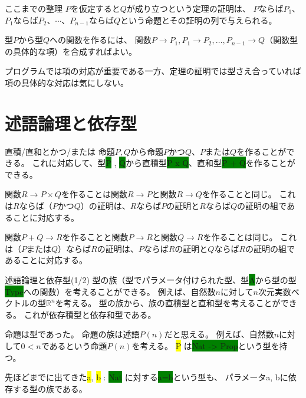 \documentclass[unicode,12pt]{beamer}%
\newcommand{\type}[1]{\colorbox{green}{#1}}
\newcommand{\term}[1]{\colorbox{yellow}{#1}}
\begin{document}
\begin{frame}{ここまでの整理}
  $P$を仮定すると$Q$が成り立つという定理の証明は、
  $P$ならば$P_1$、$P_1$ならば$P_2$、$\cdots$、$P_{n-1}$ならば$Q$という命題とその証明の列で与えられる。

  型$P$から型$Q$への関数を作るには、
  関数$P\to P_1, P_1\to P_2,\ldots, P_{n-1}\to Q$（関数型の具体的な項）を合成すればよい。

  \pause

  プログラムでは項の対応が重要である一方、定理の証明では型さえ合っていれば項の具体的な対応は気にしない。
\end{frame}

\section{述語論理と依存型}

\begin{frame}{直積/直和とかつ/または}
  命題$P, Q$から命題$P$かつ$Q$、$P$または$Q$を作ることができる。
  これに対応して、型\type{P} , \type{Q}から直積型\type{P x Q}、直和型\type{P + Q}を作ることができる。

  \pause

  関数$R\to P\times Q$を作ることは関数$R\to P$と関数$R\to Q$を作ることと同じ。
  これは$R$ならば（$P$かつ$Q$）の証明は、$R$ならば$P$の証明と$R$ならば$Q$の証明の組であることに対応する。

  \pause

  関数$P+Q\to R$を作ることと関数$P\to R$と関数$Q\to R$を作ることは同じ。
  これは（$P$または$Q$）ならば$R$の証明は、$P$ならば$R$の証明と$Q$ならば$R$の証明の組であることに対応する。
\end{frame}

\begin{frame}{述語論理と依存型(1/2)}
  型の族（型でパラメータ付けられた型、型\type{A}から型の型\type{Type}への関数）を考えることができる。
  例えば、自然数$n$に対して$n$次元実数ベクトルの型$\mathbb{R}^n$を考える。
  型の族から、族の直積型と直和型を考えることができる。
  これが依存積型と依存和型である。

  \pause

  命題は型であった。
  命題の族は述語$P(n)$だと思える。
  例えば、自然数$n$に対して$0<n$であるという命題$P(n)$を考える。
  \term{P} は\type{Nat -> Prop}という型を持つ。

  \pause

  先ほどまでに出てきた\term{a}, \term{b} : \type{Nat} に対する\type{a=b}という型も、
  パラメータa, bに依存する型の族である。
\end{frame}
\end{document}
